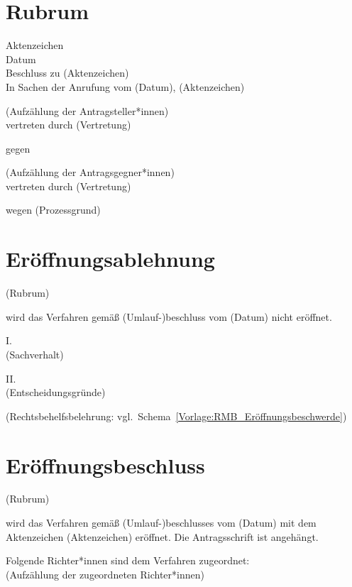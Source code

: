 \section{Rubrum}
\label{Vorlage:Rubrum}
Aktenzeichen\\
Datum\\
Beschluss zu (Aktenzeichen)\\

In Sachen der Anrufung vom (Datum), (Aktenzeichen)

(Aufzählung der Antragsteller*innen)\\
vertreten durch (Vertretung)

gegen

(Aufzählung der Antragsgegner*innen)\\
vertreten durch (Vertretung)

wegen (Prozessgrund)

\section{Eröffnungsablehnung}
\label{Vorlage:Eröffnungsablehnung}
(Rubrum)

wird das Verfahren gemäß (Umlauf-)beschluss vom (Datum) nicht eröffnet.

I.\\
(Sachverhalt)

II.\\
(Entscheidungsgründe)

(Rechtsbehelfsbelehrung: vgl.~Schema~\ref{Vorlage:RMB_Eröffnungsbeschwerde})

\section{Eröffnungsbeschluss}
\label{Vorlage:Eröffnungsbeschluss}
(Rubrum)

wird das Verfahren gemäß (Umlauf-)beschlusses vom (Datum) mit dem Aktenzeichen (Aktenzeichen) eröffnet.
Die Antragsschrift ist angehängt.

Folgende Richter*innen sind dem Verfahren zugeordnet:\\
(Aufzählung der zugeordneten Richter*innen)

